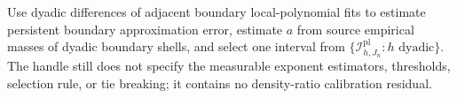 Use dyadic differences of adjacent boundary local-polynomial fits to estimate persistent boundary approximation error, estimate \(a\) from source empirical masses of dyadic boundary shells, and select one interval from \(\{\mathcal I^{\mathrm{pl}}_{h,J_n}:h\text{ dyadic}\}\). The handle still does not specify the measurable exponent estimators, thresholds, selection rule, or tie breaking; it contains no density-ratio calibration residual.
